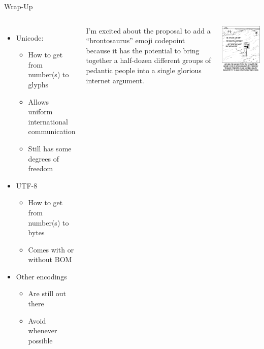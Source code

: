 \begin{frame}{Wrap-Up}
%
\begin{columns}
\begin{itemize}
\item Unicode:
	\begin{itemize}
	\item How to get from number(s) to glyphs
	\item Allows uniform international communication
	\item Still has some degrees of freedom
	\end{itemize}
\item UTF-8
	\begin{itemize}
	\item How to get from number(s) to bytes
	\item Comes with or without BOM
	\end{itemize}
\item Other encodings
	\begin{itemize}
	\item Are still out there
	\item Avoid whenever possible
	\end{itemize}
\end{itemize}
%
\begin{center}
	\footnotesize
	I'm excited about the proposal to add a \enquote{brontosaurus} emoji codepoint because it has the potential to bring together a half-dozen 
	different groups of pedantic people into a single glorious internet argument.
\end{center}
%
\begin{center}
	\includegraphics[width=\linewidth]{./gfx/xkcd-unicode}
	

\end{center}
\end{columns}
\end{frame}
